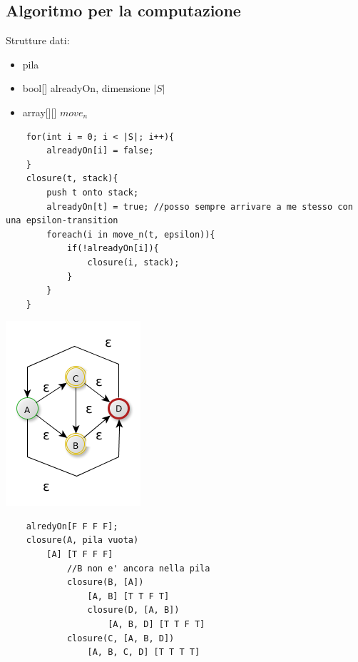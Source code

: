 \subsection{Algoritmo per la computazione}
Strutture dati:
\begin{itemize}
    \item pila\\
    \item bool[] alreadyOn, dimensione $|S|$\\
    \item array[][] $move_n$\\ 
\end{itemize}
\begin{lstlisting}
    for(int i = 0; i < |S|; i++){
        alreadyOn[i] = false;
    }
    closure(t, stack){
        push t onto stack;
        alreadyOn[t] = true; //posso sempre arrivare a me stesso con una epsilon-transition 
        foreach(i in move_n(t, epsilon)){
            if(!alreadyOn[i]){
                closure(i, stack);
            }
        }
    }
\end{lstlisting}

\begin{center}
	\includegraphics[scale=0.4]{Chapters/Img/c02_02.png}\\
\end{center} 

\begin{lstlisting}
    alredyOn[F F F F];
    closure(A, pila vuota)
        [A] [T F F F]
            //B non e' ancora nella pila
            closure(B, [A])
                [A, B] [T T F T]
                closure(D, [A, B])
                    [A, B, D] [T T F T]
            closure(C, [A, B, D])
                [A, B, C, D] [T T T T]
\end{lstlisting}

